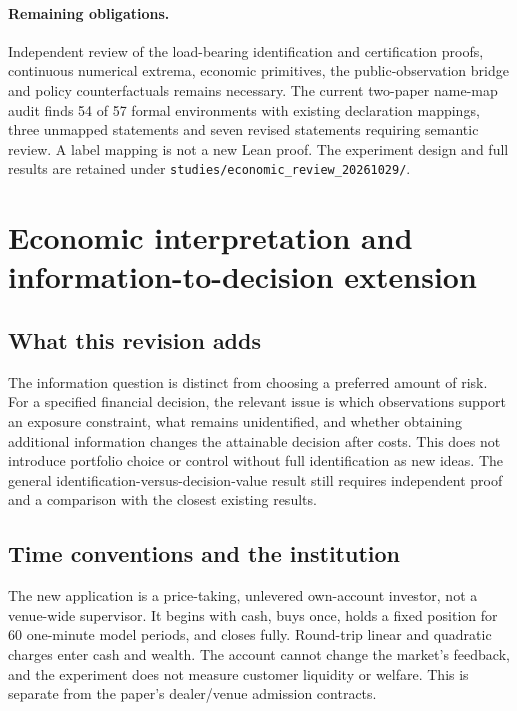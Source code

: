 \paragraph{Remaining obligations.} Independent review of the load-bearing
identification and certification proofs, continuous numerical extrema, economic
primitives, the public-observation bridge and policy counterfactuals remains
necessary. The current two-paper name-map audit finds 54 of 57 formal environments
with existing declaration mappings, three unmapped statements and seven revised
statements requiring semantic review. A label mapping is not a new Lean proof.
The experiment design and full results are retained under
\texttt{studies/economic\_review\_20261029/}.


\section*{Economic interpretation and information-to-decision extension}

\subsection*{What this revision adds}
The information question is distinct from choosing a preferred amount of risk.
For a specified financial decision, the relevant issue is which observations
support an exposure constraint, what remains unidentified, and whether obtaining
additional information changes the attainable decision after costs. This does
not introduce portfolio choice or control without full identification as new
ideas. The general identification-versus-decision-value result still requires
independent proof and a comparison with the closest existing results.

\subsection*{Time conventions and the institution}
The new application is a price-taking, unlevered own-account investor, not a
venue-wide supervisor. It begins with cash, buys once, holds a fixed position
for 60 one-minute model periods, and closes fully. Round-trip linear and
quadratic charges enter cash and wealth. The account cannot change the market's
feedback, and the experiment does not measure customer liquidity or welfare.
This is separate from the paper's dealer/venue admission contracts.

